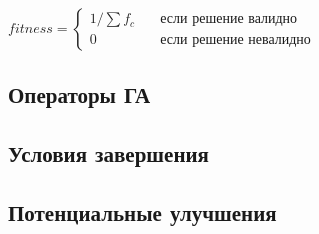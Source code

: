 \begin{center}
  $
  \displaystyle fitness =
  \begin{cases}
    1 / \sum f_{c} & \quad \text{если решение валидно} \\
    0 & \quad \text{если решение невалидно}
  \end{cases}
  $
\end{center}

\subsection*{Операторы ГА}

\subsection*{Условия завершения}

\subsection*{Потенциальные улучшения}


